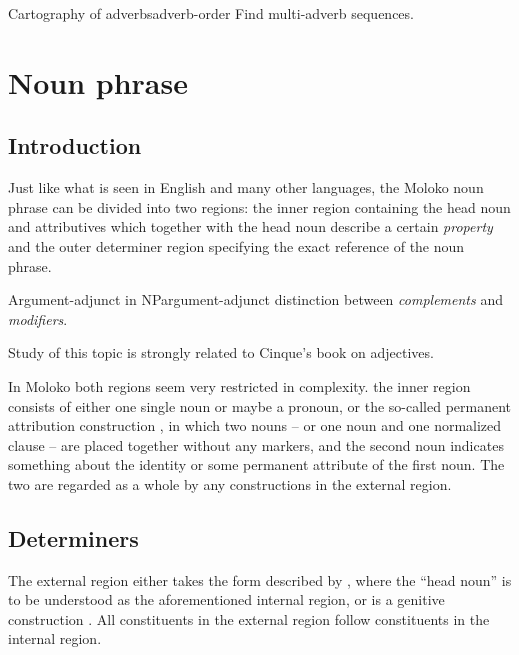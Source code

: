 \documentclass[a4paper, oneside, 12pt]{report}
\newcommand*{\citesec}[1]{\S~{#1}}
\newcommand*{\citefig}[1]{Fig.~{#1}}
\newcommand*{\citepage}[1]{p.~{#1}}
\newcommand*{\term}[1]{\emph{#1}}
\begin{document}
\begin{todobox}{Cartography of adverbs}{adverb-order}
    Find multi-adverb sequences.
\end{todobox}

\section{Noun phrase}

\subsection{Introduction}

Just like what is seen in English and many other languages,
the Moloko noun phrase can be divided into two regions:
the inner region containing the head noun 
and attributives which together with the head noun 
describe a certain \emph{property} 
and the outer determiner region specifying the exact reference of the noun phrase.

\begin{todobox}{Argument-adjunct in NP}{argument-adjunct}
    distinction between \term{complements} and \term{modifiers}.
    
    Study of this topic is strongly related to Cinque's book on adjectives.
\end{todobox}

In Moloko both regions seem very restricted in complexity.
the inner region consists of either one single noun or maybe a pronoun, 
or the so-called permanent attribution construction 
\citep[\citesec{5.4.2}]{friesen2017grammar},
in which two nouns -- or one noun and one normalized clause -- 
are placed together without any markers, 
and the second noun indicates something about the identity 
or some permanent attribute of the first noun.
The two are regarded as a whole by any constructions in the external region.

\subsection{Determiners}

The external region either takes the form described by  
\citet[\citepage{145}, \citefig{5.1}]{friesen2017grammar},
where the ``head noun'' is to be understood as 
the aforementioned internal region,
or is a genitive construction \citep[\citesec{5.4.1}]{friesen2017grammar}.
All constituents in the external region follow constituents in the internal region.
\end{document}
